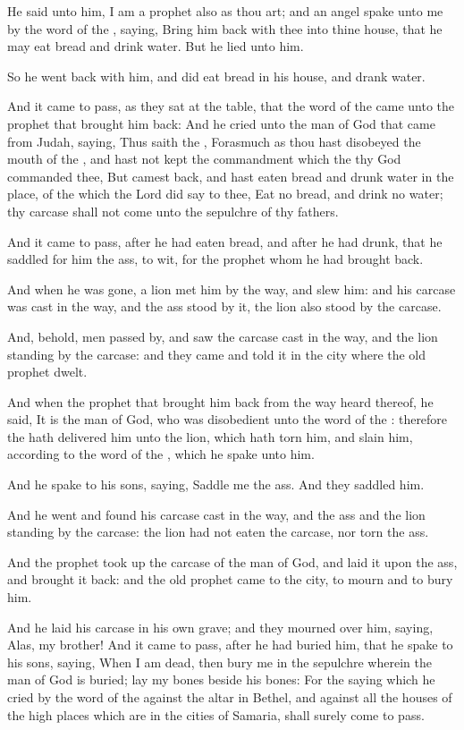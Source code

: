 \verse He said unto him, I am a prophet also as thou art; and an angel spake unto me by the word of the \LORD, saying, Bring him back with thee into thine house, that he may eat bread and drink water. But he lied unto him.

\verse So he went back with him, and did eat bread in his house, and drank water.

\verse And it came to pass, as they sat at the table, that the word of the \LORD came unto the prophet that brought him back: \verse And he cried unto the man of God that came from Judah, saying, Thus saith the \LORD, Forasmuch as thou hast disobeyed the mouth of the \LORD, and hast not kept the commandment which the \LORD thy God commanded thee, \verse But camest back, and hast eaten bread and drunk water in the place, of the which the Lord did say to thee, Eat no bread, and drink no water; thy carcase shall not come unto the sepulchre of thy fathers.

\verse And it came to pass, after he had eaten bread, and after he had drunk, that he saddled for him the ass, to wit, for the prophet whom he had brought back.

\verse And when he was gone, a lion met him by the way, and slew him: and his carcase was cast in the way, and the ass stood by it, the lion also stood by the carcase.

\verse And, behold, men passed by, and saw the carcase cast in the way, and the lion standing by the carcase: and they came and told it in the city where the old prophet dwelt.

\verse And when the prophet that brought him back from the way heard thereof, he said, It is the man of God, who was disobedient unto the word of the \LORD: therefore the \LORD hath delivered him unto the lion, which hath torn him, and slain him, according to the word of the \LORD, which he spake unto him.

\verse And he spake to his sons, saying, Saddle me the ass. And they saddled him.

\verse And he went and found his carcase cast in the way, and the ass and the lion standing by the carcase: the lion had not eaten the carcase, nor torn the ass.

\verse And the prophet took up the carcase of the man of God, and laid it upon the ass, and brought it back: and the old prophet came to the city, to mourn and to bury him.

\verse And he laid his carcase in his own grave; and they mourned over him, saying, Alas, my brother!  \verse And it came to pass, after he had buried him, that he spake to his sons, saying, When I am dead, then bury me in the sepulchre wherein the man of God is buried; lay my bones beside his bones: \verse For the saying which he cried by the word of the \LORD against the altar in Bethel, and against all the houses of the high places which are in the cities of Samaria, shall surely come to pass.

